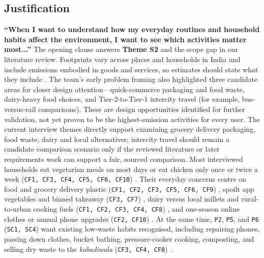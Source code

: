 \documentclass[12pt, a4paper]{article}
\begin{document}
\subsection{Justification}
\textbf{``When I want to understand how my everyday routines and household habits affect the environment, I want to see which activities matter most...''}
The opening clause answers \textbf{Theme S2} and the scope gap in our literature review. Footprints vary across places and households in India \cite{lee2021} and include emissions embodied in goods and services, so estimates should state what they include \cite{shi2021}. The team’s early problem framing also highlighted three candidate areas for closer design attention—quick-commerce packaging and food waste, dairy-heavy food choices, and Tier-2-to-Tier-1 intercity travel (for example, bus-versus-rail comparisons). These are design opportunities identified for further validation, not yet proven to be the highest-emission activities for every user. The current interview themes directly support examining grocery delivery packaging, food waste, dairy and local alternatives; intercity travel should remain a candidate comparison scenario only if the reviewed literature or later requirements work can support a fair, sourced comparison. Most interviewed households eat vegetarian meals on most days or eat chicken only once or twice a week (\texttt{CF1, CF3, CF4, CF5, CF6, CF10}) \cite{cf1,cf3,cf4,cf5,cf6,cf10}. Their everyday concerns centre on food and grocery delivery plastic (\texttt{CF1, CF2, CF3, CF5, CF6, CF9}) \cite{cf1,cf2,cf3,cf5,cf6,cf9}, spoilt app vegetables and binned takeaway (\texttt{CF3, CF7}) \cite{cf3,cf7}, dairy versus local millets and rural-to-urban cooking fuels (\texttt{CF1, CF2, CF3, CF4, CF8}) \cite{cf1,cf2,cf3,cf4,cf8}, and one-season online clothes or annual phone upgrades (\texttt{CF2, CF10}) \cite{cf2,cf10}. At the same time, \texttt{P2}, \texttt{P5}, and \texttt{P6} (\texttt{SC1, SC4}) want existing low-waste habits recognised, including repairing phones, passing down clothes, bucket bathing, pressure-cooker cooking, composting, and selling dry waste to the \textit{kabadiwala} (\texttt{CF3, CF4, CF8}) \cite{cf3,cf4,cf8}.
\end{document}
